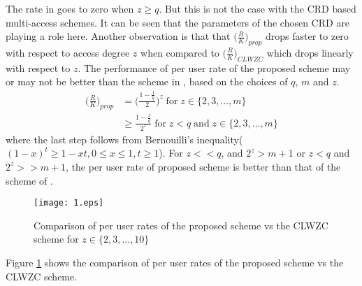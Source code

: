 \documentclass[conference]{IEEEtran}
\begin{document}
		The rate in \cite{CLWZC} goes to zero when $z \geq q$. 
		But this is not the case with the CRD based multi-access schemes.
		It can be seen that the parameters of the chosen CRD are playing a role here. 
		 Another observation is that that $\big(\frac{R}{K}\big)_{prop}$ drops faster to zero with respect to access degree $z$ when compared to $\big(\frac{R}{K}\big)_{CLWZC}$ which drops linearly with respect to $z$. The performance of per user rate of the proposed scheme may or may not be better than the scheme in \cite{CLWZC}, based on the choices of $q$, $m$ and $z$.	
		\begin{align*}
		 \Big(\frac{R}{K}\Big)_{prop} &=\Big({\frac{1 - \frac{1}{q}}{2}}\Big)^z \;\text{for}\; z \in \{2,3,\dots,m\}\\
		 &\geq \frac{1 - \frac{z}{q}}{2^z}\; \text{for}\;z<q \;\text{and}\;  z \in \{2,3,\dots,m\} 
		\end{align*}
		where the last step follows from Bernouilli's inequality($(1 - x)^t \geq 1-xt, 0 \leq x \leq 1, t \geq 1$).
		For $z << q$, and $2^z > m + 1$ or $z < q$ and $2^z >> m + 1$, the per user rate of proposed scheme is better than that of the scheme of \cite{CLWZC}.
\begin{figure}
			\texttt{[image: 1.eps]}
			\begin{center}
				\caption {Comparison of per user rates of the proposed scheme vs the CLWZC scheme for $z \in \{2,3,\dots,10\}$}
				\label{fig5}
			\end{center}
\end{figure} 
 Figure \ref{fig5} shows the comparison of per user rates of the proposed scheme vs the CLWZC scheme.
%		
%		
%	
%		
	
\end{document}
